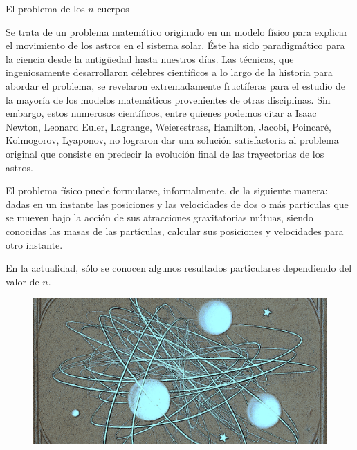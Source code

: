 \newpage %
\begin{myblock}{El problema de los $n$ cuerpos}

\vspace{2mm} Se trata de un problema matemático originado en un modelo físico para explicar el movimiento de los astros en el sistema solar. Éste ha sido paradigmático para la ciencia desde la antigüedad hasta nuestros días. Las técnicas, que ingeniosamente desarrollaron célebres científicos a lo largo de la historia para abordar el problema, se revelaron extremadamente fructíferas para el estudio de la mayoría de los modelos matemáticos provenientes de otras disciplinas. Sin embargo, estos numerosos científicos, entre quienes podemos citar a Isaac Newton, Leonard Euler, Lagrange, Weierestrass, Hamilton, Jacobi, Poincaré, Kolmogorov, Lyaponov, no lograron dar una solución satisfactoria al problema original que consiste en predecir la evolución final de las trayectorias de los astros. 

\vspace{2mm} El problema físico puede formularse, informalmente, de la siguiente manera: dadas en un instante las posiciones y las velocidades de dos o más partículas que se mueven bajo la acción de sus atracciones gravitatorias mútuas, siendo conocidas las masas de las partículas, calcular sus posiciones y velocidades para otro instante. 

\vspace{2mm} En la actualidad, sólo se conocen algunos resultados particulares dependiendo del valor de $n$.	

\begin{figure}[H]
	\centering
	\includegraphics[width=1\textwidth]{imagenes/imagenes13/T13IM03.png}
\end{figure}
\end{myblock}
